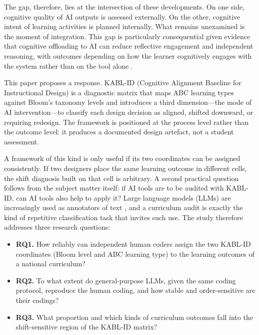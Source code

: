 \documentclass[journal,article,submit,pdftex,moreauthors]{Definitions/mdpi}
\begin{document}
The gap, therefore, lies at the intersection of these developments. On one side, cognitive quality of AI outputs is assessed externally. On the other, cognitive intent of learning activities is planned internally. What remains unexamined is the moment of integration. This gap is particularly consequential given evidence that cognitive offloading to AI can reduce reflective engagement and independent reasoning, with outcomes depending on how the learner cognitively engages with the system rather than on the tool alone \cite{risko_gilbert_2016, zhai_2024, gerlich_2025, fan_2025}.

This paper proposes a response. KABL-ID (Cognitive Alignment Baseline for Instructional Design) is a diagnostic matrix that maps ABC learning types against Bloom's taxonomy levels and introduces a third dimension---the mode of AI intervention---to classify each design decision as aligned, shifted downward, or requiring redesign. The framework is positioned at the process level rather than the outcome level: it produces a documented design artefact, not a student assessment.

A framework of this kind is only useful if its two coordinates can be assigned consistently. If two designers place the same learning outcome in different cells, the shift diagnosis built on that cell is arbitrary. A second practical question follows from the subject matter itself: if AI tools are to be audited with KABL-ID, can AI tools also help to apply it? Large language models (LLMs) are increasingly used as annotators of text \cite{gilardi_2023, ziems_2024}, and a curriculum audit is exactly the kind of repetitive classification task that invites such use. The study therefore addresses three research questions:
\begin{itemize}[leftmargin=*]
  \item \textbf{RQ1.} How reliably can independent human coders assign the two KABL-ID coordinates (Bloom level and ABC learning type) to the learning outcomes of a national curriculum?
  \item \textbf{RQ2.} To what extent do general-purpose LLMs, given the same coding protocol, reproduce the human coding, and how stable and order-sensitive are their codings?
  \item \textbf{RQ3.} What proportion and which kinds of curriculum outcomes fall into the shift-sensitive region of the KABL-ID matrix?
\end{itemize}
\end{document}

